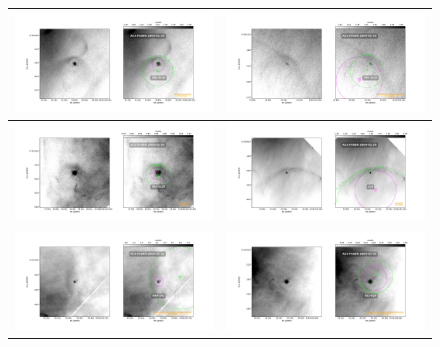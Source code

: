  
\begin{figure}[htp]
\centering
\begin{tabular}{|l|l|}
\hline
    \includegraphics[width=0.47\linewidth,  trim=60 50 100 50, clip]{j8oc08010_wcs/308-3036-Bally_08-images.pdf}
    &\includegraphics[width=0.47\linewidth,  trim=60 50 100 50, clip]{j8oc08010_wcs/344-3020-Bally_08-images.pdf}\\ \hline
    \includegraphics[width=0.47\linewidth,  trim=60 50 100 50, clip]{j8oc08010_wcs/362-3137-Bally_08-images.pdf}
    &\includegraphics[width=0.47\linewidth,  trim=60 50 100 50, clip]{j8oc08010_wcs/LL6-Bally_08-images.pdf}\\ \hline
    \includegraphics[width=0.47\linewidth,  trim=60 50 100 50, clip]{j8oc09010_wcs/049-143-Bally_09-images.pdf}
    &\includegraphics[width=0.47\linewidth,  trim=60 50 100 50, clip]{j8oc09010_wcs/051-024-Bally_09-images.pdf}\\ \hline

\end{tabular}
\end{figure}
